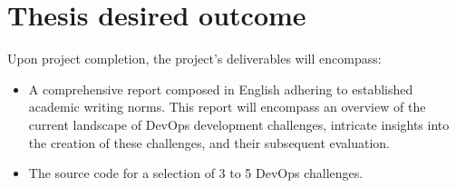 \documentclass[a4, 12pt]{article}
\begin{document}
\section{Thesis desired outcome}

Upon project completion, the project's deliverables will encompass:
\begin{itemize}
    \item A comprehensive report composed in English
    adhering to established academic writing norms. 
    This report will encompass an overview of the current 
    landscape of DevOps development challenges, intricate insights into the creation of these challenges, and their subsequent evaluation.
    \item The source code for a selection of 3 to 5 DevOps challenges.
\end{itemize}




\end{document}
